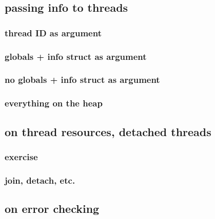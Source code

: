 




\subsection{passing info to threads}

\subsubsection{thread ID as argument}


\subsubsection{globals + info struct as argument}



\subsubsection{no globals + info struct as argument}



\subsubsection{everything on the heap}



\subsection{on thread resources, detached threads}

\subsubsection{exercise}


\subsubsection{join, detach, etc.}


\subsection{on error checking}




